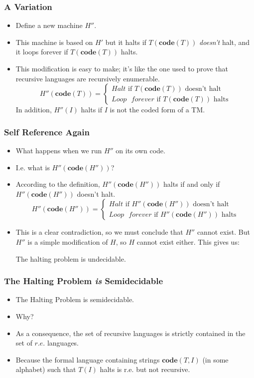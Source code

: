 \documentclass[handout]{beamer}
\newcommand{\co}{\mathbf{code}}
\begin{document}
\begin{frame}
\frametitle{A Variation}
\begin{itemize}
\item Define a new machine $H''$. 
\vspace{0.2cm}
\item This machine is based on $H'$ but it halts if $T(\co(T))$ \emph{doesn't} halt, and it loops forever if $T(\co(T))$ halts. 
\vspace{0.2cm}
\item This modification is easy to make; it's like the one used to prove that recursive languages are recursively enumerable. 
\[H''(\co(T))=\begin{cases}Halt \text{ if } T(\co(T)) \text{ doesn't halt}\\ Loop\text{ }forever \text{ if } T(\co(T)) \text{ halts}\end{cases}\] 
In addition, $H''(I)$ halts if $I$ is not the coded form of a TM.
\end{itemize}
\end{frame}

\begin{frame}
\frametitle{Self Reference Again}
\begin{itemize}
\item What happens when we run $H''$ on its own code. 
\item I.e. what is $H''(\co(H''))$? 
\item According to the definition, $H''(\co(H''))$ halts if and only if $H''(\co(H''))$ doesn't halt. 
\[H''(\co(H''))=\begin{cases}Halt \text{ if } H''(\co(H'')) \text{ doesn't halt}\\ Loop\text{ }forever \text{ if } H''(\co(H'')) \text{ halts}\end{cases}\] 
\item This is a clear contradiction, so we must conclude that $H''$ cannot exist. But $H''$ is a simple modification of $H$, so $H$ cannot exist either. This gives us:

\begin{theorem}
The halting problem is undecidable.
\end{theorem} 
\end{itemize}
\end{frame}

\begin{frame}
\frametitle{The Halting Problem \emph{is} Semidecidable}
\begin{itemize}
\item The Halting Problem is semidecidable.
\vspace{0.4cm}
\item Why?
\vspace{0.4cm}
\item As a consequence, the set of recursive languages is strictly contained in the set of $r.e.$ languages.
\vspace{0.4cm}
\item Because the formal language containing strings $\co(T,I)$ (in some alphabet) such that $T(I)$ halts is r.e. but not recursive.
\end{itemize}
\end{frame}
\end{document}
